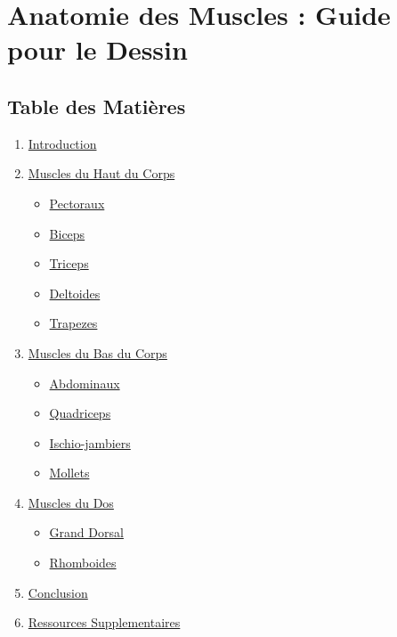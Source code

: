\documentclass[
]{article}
\author{}
\date{}
\providecommand{\tightlist}{%
  \setlength{\itemsep}{0pt}\setlength{\parskip}{0pt}}
\begin{document}
\section{Anatomie des Muscles : Guide pour le
Dessin}\label{anatomie-des-muscles-guide-pour-le-dessin}

\subsection{Table des Matières}\label{table-des-matiuxe8res}

\begin{enumerate}
\def\labelenumi{\arabic{enumi}.}
\tightlist
\item
  \hyperref[introduction]{Introduction}
\item
  \hyperref[muscles-du-haut-du-corps]{Muscles du Haut du Corps}

  \begin{itemize}
  \tightlist
  \item
    \hyperref[pectoraux]{Pectoraux}
  \item
    \hyperref[biceps]{Biceps}
  \item
    \hyperref[triceps]{Triceps}
  \item
    \hyperref[deltoides]{Deltoides}
  \item
    \hyperref[trapezes]{Trapezes}
  \end{itemize}
\item
  \hyperref[muscles-du-bas-du-corps]{Muscles du Bas du Corps}

  \begin{itemize}
  \tightlist
  \item
    \hyperref[abdominaux]{Abdominaux}
  \item
    \hyperref[quadriceps]{Quadriceps}
  \item
    \hyperref[ischio-jambiers]{Ischio-jambiers}
  \item
    \hyperref[mollets]{Mollets}
  \end{itemize}
\item
  \hyperref[muscles-du-dos]{Muscles du Dos}

  \begin{itemize}
  \tightlist
  \item
    \hyperref[grand-dorsal]{Grand Dorsal}
  \item
    \hyperref[rhomboides]{Rhomboides}
  \end{itemize}
\item
  \hyperref[conclusion]{Conclusion}
\item
  \hyperref[ressources-supplementaires]{Ressources Supplementaires}
\end{enumerate}
\end{document}
